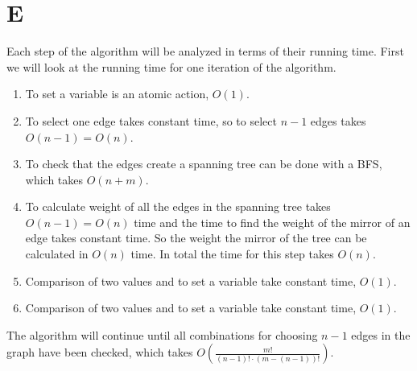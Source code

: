 \section{E}
Each step of the algorithm will be analyzed in terms of their running time. First we will look at the running time for one iteration of the algorithm.
\begin{enumerate}
    \item To set a variable is an atomic action, $O(1)$.
    \item To select one edge takes constant time, so to select $n-1$ edges takes $O(n-1) = O(n)$.
    \item To check that the edges create a spanning tree can be done with a BFS, which takes $O(n+m)$.
    \item To calculate weight of all the edges in the spanning tree takes $O(n-1) = O(n)$ time and the time to find the weight of the mirror of an edge takes constant time. So the weight the mirror of the tree can be calculated in $O(n)$ time. In total the time for this step takes $O(n)$.
    \item Comparison of two values and to set a variable take constant time, $O(1)$.
    \item Comparison of two values and to set a variable take constant time, $O(1)$.
\end{enumerate}
The algorithm will continue until all combinations for choosing $n-1$ edges in the graph have been checked, which takes $O\left(\frac{m!}{(n-1)!\cdot(m-(n-1))!}\right)$.